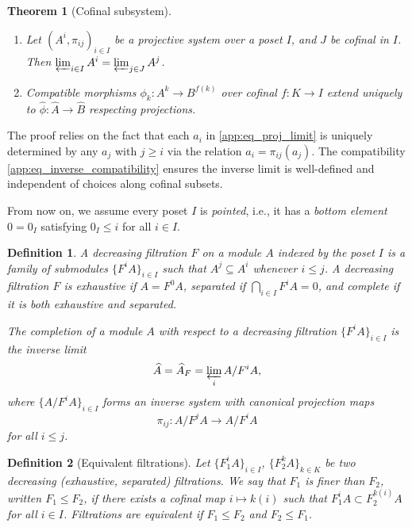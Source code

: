 \documentclass[a4paper,12pt]{amsart}
\newtheorem{theorem}{Theorem}
\newtheorem{deff}{Definition}
\newcommand{\mto}{\mapsto}
\begin{document}
\begin{theorem}[Cofinal subsystem]\label{app:thm_cofinal}\normalfont{\mbox{}\vskip 2mm}
\begin{enumerate}
    \item Let $(A^i,\pi_{ij})_{i\in I}$ be a projective system over a poset $I$, and 
$J$ be \emph{cofinal} in $I$. 
Then \(
\varprojlim_{i\in I} A^i = \varprojlim_{j\in J} A^j
\).
\item Compatible morphisms $\phi_k\colon A^k\to B^{f(k)}$ over cofinal $f\colon K\to I$ extend uniquely to 
$\hat{\phi}\colon\hat{A}\to\hat{B}$ respecting projections.
\end{enumerate}
\end{theorem}


\noindent The proof relies on the fact that each $a_i$ in \eqref{app:eq_proj_limit} is uniquely determined by any $a_j$ with $j\ge i$ via the relation $a_i=\pi_{ij}(a_j)$. 
The compatibility \eqref{app:eq_inverse_compatibility} ensures the inverse limit is well-defined and independent of choices along cofinal subsets.

\smallskip\noindent From now on, we assume every poset $I$ is \emph{pointed}, i.e., it has a \emph{bottom element} $0=0_I$ satisfying $0_I\le i$ for all $i\in I$.



\begin{deff}\label{app:deff_filtration}\normalfont
A \emph{decreasing filtration} $F$ on a module $A$ indexed by the poset $I$ is a family of submodules $\{F^i A\}_{i\in I}$ such that \( A^j \subseteq A^i\) whenever $i\le j$. 
A decreasing filtration $F$ is 
\emph{exhaustive} if $A = F^0 A$, \emph{separated} if $\bigcap_{i\in I} F^i A = 0$, 
and \emph{complete} if it is both exhaustive and separated. 

\smallskip\noindent
The completion of a module $A$ with respect to a decreasing filtration $\{F^i A\}_{i\in I}$ is the inverse limit
\[
\widehat{A} =\widehat{A}_F = \varprojlim_i A/F^i A,
\]
where $\{A/F^i A\}_{i\in I}$ forms an inverse system with canonical projection maps 
\[
\pi_{ij}\colon A/F^j A \to A/F^i A
\]
for all $i \leq j$.
\end{deff}





\begin{deff}[Equivalent filtrations]\label{app:def_equiv}\normalfont
Let $\{F_1^i A\}_{i \in I}$, $\{F_2^k A\}_{k \in K}$ be two decreasing (exhaustive, separated) filtrations. We say that $F_1$ is \emph{finer} than $F_2$, written $F_1 \leq F_2$, if there exists a cofinal map $i\mto k(i)$ such that $F_1^i A \subset F_2^{k(i)} A$ for all $i \in I$. Filtrations are \emph{equivalent} if $F_1 \leq F_2$ and $F_2 \leq F_1$.
\end{deff}
\end{document}
